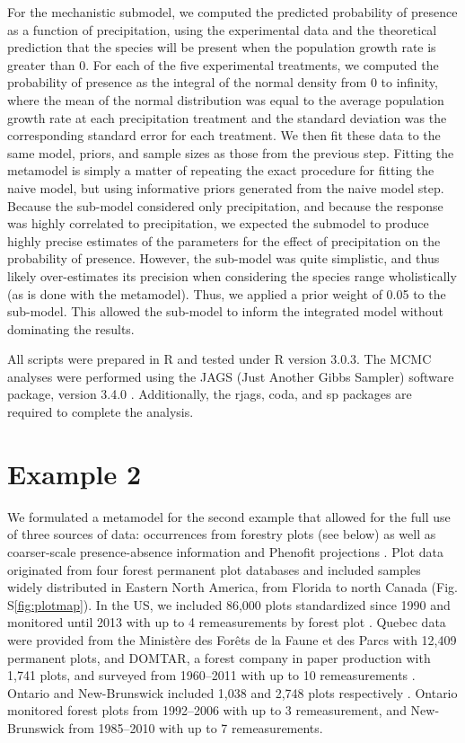 \documentclass[11pt]{article}
\begin{document}
For the mechanistic submodel, we computed the predicted probability of presence as a function of precipitation, using the experimental data and the theoretical prediction that the species will be present when the population growth rate is greater than 0.
For each of the five experimental treatments, we computed the probability of presence as the integral of the normal density from 0 to infinity, where the mean of the normal distribution was equal to the average population growth rate at each precipitation treatment and the standard deviation was the corresponding standard error for each treatment.
We then fit these data to the same model, priors, and sample sizes as those from the previous step.
Fitting the metamodel is simply a matter of repeating the exact procedure for fitting the naive model, but using informative priors generated from the naive model step.
Because the sub-model considered only precipitation, and because the response was highly correlated to precipitation, we expected the submodel to produce highly precise estimates of the parameters for the effect of precipitation on the probability of presence.
However, the sub-model was quite simplistic, and thus likely over-estimates its precision when considering the species range wholistically (as is done with the metamodel).
Thus, we applied a prior weight of 0.05 to the sub-model.
This allowed the sub-model to inform the integrated model without dominating the results.

All scripts were prepared in R and tested under R version 3.0.3.
The MCMC analyses were performed using the JAGS (Just Another Gibbs Sampler) software package, version 3.4.0 \citep{RJAGS}.
Additionally, the rjags, coda, and sp packages are required to complete the analysis.

\section*{Example 2}
We formulated a metamodel for the second example that allowed for the full use of three sources of data: occurrences from forestry plots (see below) as well as coarser-scale presence-absence information and Phenofit projections \citep[both from][]{Morin2009}.
Plot data originated from four forest permanent plot databases and included samples widely distributed in Eastern North America, from Florida to north Canada (Fig. S\ref{fig:plotmap}).
In the US, we included 86,000 plots standardized since 1990 and monitored until 2013 with up to 4 remeasurements by forest plot \citep{OConnell2013}.
Quebec data were provided from the Ministère des Forêts de la Faune et des Parcs with 12,409 permanent plots, and DOMTAR, a forest company in paper production with 1,741 plots, and surveyed from 1960--2011 with up to 10 remeasurements \citep{MFFP2013}.
Ontario and New-Brunswick included 1,038 and 2,748 plots respectively \citep{Porter1999, Ontario2014}.
Ontario monitored forest plots from 1992--2006 with up to 3 remeasurement, and New-Brunswick from 1985--2010 with up to 7 remeasurements.
\end{document}

